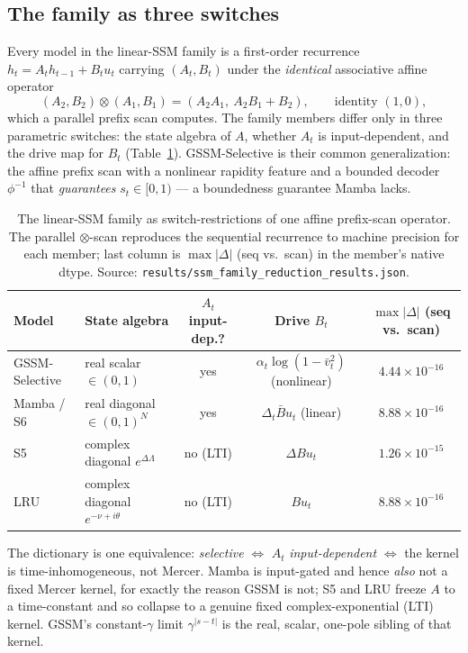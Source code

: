 \documentclass[11pt]{article}
\theoremstyle{definition}
\newcommand{\vbar}{\bar{v}}
\newcommand{\code}[1]{\texttt{#1}}
\begin{document}
\subsection{The family as three switches}
Every model in the linear-SSM family is a first-order recurrence
$h_t=A_t h_{t-1}+B_t u_t$ carrying $(A_t,B_t)$ under the \emph{identical} associative affine
operator
\begin{equation}
(A_2,B_2)\otimes(A_1,B_1)=(A_2 A_1,\ A_2 B_1 + B_2),\qquad \text{identity }(1,0),
\label{eq:monoid}
\end{equation}
which a parallel prefix scan computes. The family members differ only in three parametric
switches: the state algebra of $A$, whether $A_t$ is input-dependent, and the drive map for
$B_t$ (Table~\ref{tab:family}). GSSM-Selective is their common generalization: the affine
prefix scan with a nonlinear rapidity feature and a bounded decoder $\phi^{-1}$ that
\emph{guarantees} $s_t\in[0,1)$ --- a boundedness guarantee Mamba lacks.

\begin{table}[t]
\centering
\caption{The linear-SSM family as switch-restrictions of one affine prefix-scan operator.
The parallel $\otimes$-scan reproduces the sequential recurrence to machine precision for
each member; last column is $\max|\Delta|$ (seq vs.\ scan) in the member's native dtype.
Source: \code{results/ssm\_family\_reduction\_results.json}.}
\label{tab:family}
\footnotesize
\setlength{\tabcolsep}{4.5pt}
\begin{tabular}{@{}llccc@{}}
\toprule
Model & State algebra & $A_t$ input-dep.? & Drive $B_t$ & $\max|\Delta|$ (seq vs.\ scan)\\
\midrule
GSSM-Selective & real scalar $\in(0,1)$ & yes & $\alpha_t\log(1-\vbar_t^2)$ (nonlinear) & $4.44\times10^{-16}$\\
Mamba / S6 & real diagonal $\in(0,1)^N$ & yes & $\Delta_t\bar B u_t$ (linear) & $8.88\times10^{-16}$\\
S5 & complex diagonal $e^{\Delta\Lambda}$ & no (LTI) & $\Delta B u_t$ & $1.26\times10^{-15}$\\
LRU & complex diagonal $e^{-\nu+i\theta}$ & no (LTI) & $B u_t$ & $8.88\times10^{-16}$\\
\bottomrule
\end{tabular}
\end{table}

The dictionary is one equivalence: \emph{selective} $\Leftrightarrow$ $A_t$
\emph{input-dependent} $\Leftrightarrow$ the kernel is time-inhomogeneous, not Mercer. Mamba
is input-gated and hence \emph{also} not a fixed Mercer kernel, for exactly the reason GSSM
is not; S5 and LRU freeze $A$ to a time-constant and so collapse to a genuine fixed
complex-exponential (LTI) kernel. GSSM's constant-$\gamma$ limit $\gamma^{|s-t|}$ is the real,
scalar, one-pole sibling of that kernel.
\end{document}

